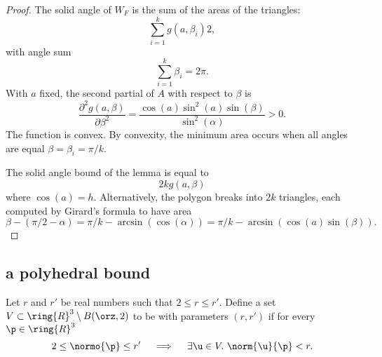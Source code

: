 \begin{proof}
The solid angle of $W_F$ is the sum of the areas of the triangles:
\begin{displaymath} 
\sum_{i=1}^k g(a,\beta_i) 2,
\end{displaymath}
with angle sum
\begin{displaymath} 
\sum_{i=1}^k \beta_i = 2\pi.
\end{displaymath}
With  $a$ fixed, the second partial of $A$ with respect to $\beta$ is
\begin{displaymath} 
\frac{\partial^2 g(a,\beta)}{\partial \beta^2} = 
\frac{\cos(a)\sin^2(a)\sin(\beta)}{\sin^2(\alpha)} > 0.
\end{displaymath}
The function is convex.
By convexity, the minimum area occurs when all angles are equal
$\beta=\beta_i = \pi/k$.

The solid angle bound of the lemma is equal to 
\begin{displaymath} 
2 k g(a,\beta)
\end{displaymath}
where $\cos(a)=h$.  Alternatively, the polygon breaks into $2k$
triangles, each computed by Girard's formula to have area
\begin{displaymath} 
\beta - (\pi/2 - \alpha)  = \pi/k - \arcsin(\cos(\alpha)) = 
\pi/k - \arcsin(\cos(a)\sin(\beta)).
\end{displaymath}
\end{proof}




\subsection{a polyhedral bound}

\begin{definition} 
Let $r$ and $r'$ be real numbers such that $2\le r\le r'$.  Define a
set $ V\subset\ring{R}^3\setminus B(\orz,2)$ to be  with
parameters $(r,r')$ if for every $\p\in\ring{R}^3$
\begin{displaymath} 
2\le\normo{\p}\le r'~~~\implies~~~ \exists \u\in V.~\norm{ \u}{\p}< r.
\end{displaymath}
\end{definition}

